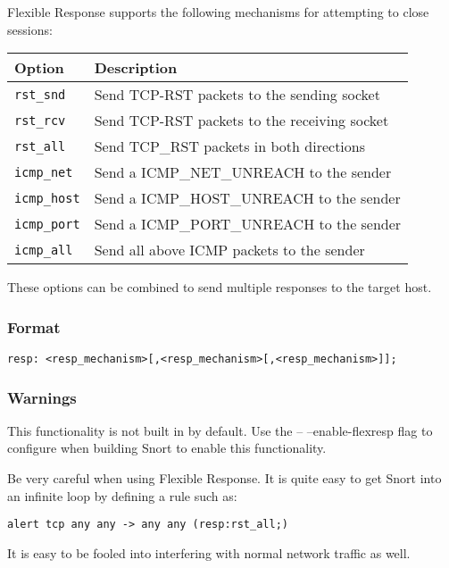 \documentclass[english]{report}
\begin{document}
Flexible Response supports the following mechanisms for attempting to close
sessions:

\begin{tabular}{| l | p{5in} |}
\hline
{\bf Option} & {\bf Description}\\
\hline
\hline
\texttt{rst\_snd} &  Send TCP-RST packets to the sending socket\\
\hline 
\texttt{rst\_rcv} & Send TCP-RST packets to the receiving socket\\
\hline 
\texttt{rst\_all} & Send TCP\_RST packets in both directions\\
\hline 
\texttt{icmp\_net} & Send a ICMP\_NET\_UNREACH to the sender\\
\hline 
\texttt{icmp\_host} & Send a ICMP\_HOST\_UNREACH to the sender\\
\hline 
\texttt{icmp\_port} & Send a ICMP\_PORT\_UNREACH to the sender\\
\hline 
\texttt{icmp\_all} & Send all above ICMP packets to the sender\\
\hline
\end{tabular}

These options can be combined to send multiple responses to the target host.

\subsubsection{Format}

\begin{verbatim}
resp: <resp_mechanism>[,<resp_mechanism>[,<resp_mechanism>]];
\end{verbatim}

\subsubsection{Warnings}

This functionality is not built in by default.  Use the -- --enable-flexresp flag
to configure when building Snort to enable this functionality.

Be very careful when using Flexible Response. It is quite easy to get Snort
into an infinite loop by defining a rule such as:

\begin{verbatim}
alert tcp any any -> any any (resp:rst_all;)
\end{verbatim}

It is easy to be fooled into interfering with normal network traffic as well.
\end{document}
